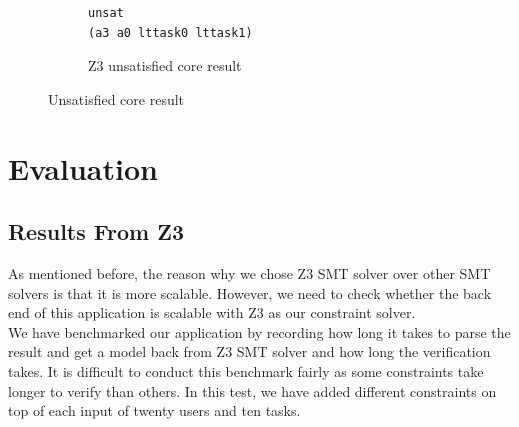 \documentclass[a4paper]{report}
\begin{document}
\clearpage
\begin{figure}
\begin{subfigure}[H]{\textwidth}
\ContinuedFloat
\begin{lstlisting}[frame=single]
unsat
(a3 a0 lttask0 lttask1)
\end{lstlisting}
\caption{Z3 unsatisfied core result}
\label{fig:Z3 unsatisfied core result}
\end{subfigure}
\caption{Unsatisfied core result}
\label{fig:Unsatisfied core result}
\end{figure}

\chapter{Evaluation}
\section{Results From Z3}
As mentioned before, the reason why we chose Z3 SMT solver over other SMT solvers is that it is more scalable. However, we need to check whether the back end of this application is scalable with Z3 as our constraint solver. \\

We have benchmarked our application by recording how long it takes to parse the result and get a model back from Z3 SMT solver and how long the verification takes. It is difficult to conduct this benchmark fairly as some constraints take longer to verify than others. In this test, we have added different constraints on top of each input of twenty users and ten tasks. \\
\end{document}
